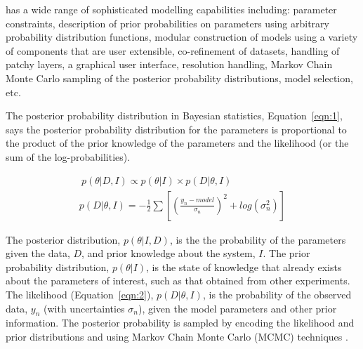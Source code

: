 \documentclass[12pt]{article}
\begin{document}
 has a wide range of sophisticated modelling capabilities including: parameter constraints, description of prior probabilities on parameters using arbitrary probability distribution functions, modular construction of models using a variety of components that are user extensible, co-refinement of datasets, handling of patchy layers, a graphical user interface, resolution handling, Markov Chain Monte Carlo sampling of the posterior probability distributions, model selection, etc.

The posterior probability distribution in Bayesian statistics, Equation~\ref{eqn:1}, says the posterior probability distribution for the parameters is proportional to the product of the prior knowledge of the parameters and the likelihood (or the sum of the log-probabilities).

\begin{gather} 
\label{eqn:1}\ p(\theta | D, I) \propto p(\theta | I)\times p(D | \theta, I)\\
p(D | \theta, I) = -\frac{1}{2} \sum [(\frac{y_n - model} {\sigma_n})^2 + log(\sigma_n^2)]\label{eqn:2}
\end{gather}

The posterior distribution, $p(\theta | I, D)$, is the the probability of the parameters given the data, $D$, and prior knowledge about the system, $I$. 
The prior probability distribution, $p(\theta | I)$, is the state of knowledge that already exists about the parameters of interest, such as that obtained from other experiments.
The likelihood (Equation~\ref{eqn:2}), $p(D | \theta, I)$, is the probability of the observed data, $y_n$ (with uncertainties $\sigma_n$), given the model parameters and other prior information.  The posterior probability is sampled by encoding the likelihood and prior distributions and using Markov Chain Monte Carlo (MCMC) techniques \cite{emcee}.
\end{document}
